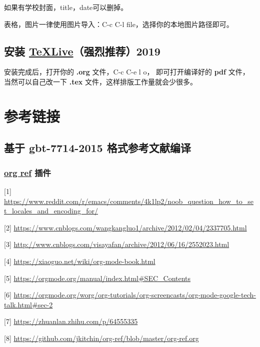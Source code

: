 \documentclass{ctexrep}
\begin{document}
如果有学校封面，title，date可以删掉。

表格，图片一律使用图片导入：C-c C-l file，选择你的本地图片路径即可。
\subsection{安装 \href{https://zhuanlan.zhihu.com/p/64555335}{TeXLive}（强烈推荐）2019}
\label{sec:org0d5f60d}
安装完成后，打开你的 \textbf{.org} 文件，C-c C-e l o，
即可打开编译好的 \textbf{pdf} 文件，当然可以自己改一下
\textbf{.tex} 文件，这样排版工作量就会少很多。
\section{参考链接}
\label{sec:orge3ab2c7}
\subsection{基于 gbt-7714-2015 格式参考文献编译}
\label{sec:org593eb55}
\subsubsection{\href{https://github.com/jkitchin/org-ref}{org ref} 插件}
\label{sec:org7b1a9e0}

[1] \url{https://www.reddit.com/r/emacs/comments/4k1lp2/noob\_question\_how\_to\_set\_locales\_and\_encoding\_for/}

[2] \url{https://www.cnblogs.com/wangkangluo1/archive/2012/02/04/2337705.html}

[3] \url{http://www.cnblogs.com/visayafan/archive/2012/06/16/2552023.html}

[4] \url{https://xiaoguo.net/wiki/org-mode-book.html}

[5] \url{https://orgmode.org/manual/index.html\#SEC\_Contents}

[6] \url{https://orgmode.org/worg/org-tutorials/org-screencasts/org-mode-google-tech-talk.html\#sec-2}

[7] \url{https://zhuanlan.zhihu.com/p/64555335}

[8] \url{https://github.com/jkitchin/org-ref/blob/master/org-ref.org}
\end{document}
